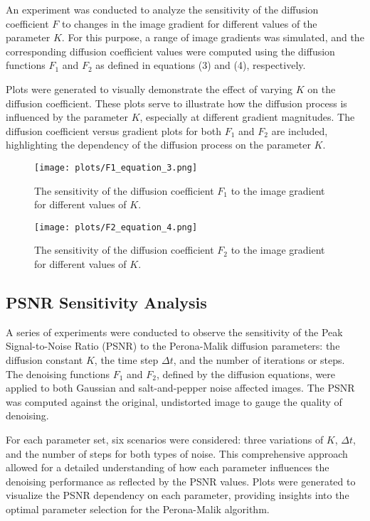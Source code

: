 \documentclass{article}
\begin{document}
An experiment was conducted to analyze the sensitivity of the diffusion coefficient \( F \) to changes in the image gradient for different values of the parameter \( K \). For this purpose, a range of image gradients was simulated, and the corresponding diffusion coefficient values were computed using the diffusion functions \( F_1 \) and \( F_2 \) as defined in equations (3) and (4), respectively.

Plots were generated to visually demonstrate the effect of varying \( K \) on the diffusion coefficient. These plots serve to illustrate how the diffusion process is influenced by the parameter \( K \), especially at different gradient magnitudes. The diffusion coefficient versus gradient plots for both \( F_1 \) and \( F_2 \) are included, highlighting the dependency of the diffusion process on the parameter \( K \).

\begin{figure}[H]
    \centering
    \texttt{[image: plots/F1\_equation\_3.png]}
    \caption{The sensitivity of the diffusion coefficient \( F_1 \) to the image gradient for different values of \( K \).}
    \label{fig:diffusion_f1}
\end{figure}

\begin{figure}[H]
    \centering
    \texttt{[image: plots/F2\_equation\_4.png]}
    \caption{The sensitivity of the diffusion coefficient \( F_2 \) to the image gradient for different values of \( K \).}
    \label{fig:diffusion_f2}
\end{figure}

\subsection{PSNR Sensitivity Analysis}

A series of experiments were conducted to observe the sensitivity of the Peak Signal-to-Noise Ratio (PSNR) to the Perona-Malik diffusion parameters: the diffusion constant \( K \), the time step \( \Delta t \), and the number of iterations or steps. The denoising functions \( F_1 \) and \( F_2 \), defined by the diffusion equations, were applied to both Gaussian and salt-and-pepper noise affected images. The PSNR was computed against the original, undistorted image to gauge the quality of denoising.

For each parameter set, six scenarios were considered: three variations of \( K \), \( \Delta t \), and the number of steps for both types of noise. This comprehensive approach allowed for a detailed understanding of how each parameter influences the denoising performance as reflected by the PSNR values. Plots were generated to visualize the PSNR dependency on each parameter, providing insights into the optimal parameter selection for the Perona-Malik algorithm.
\end{document}
